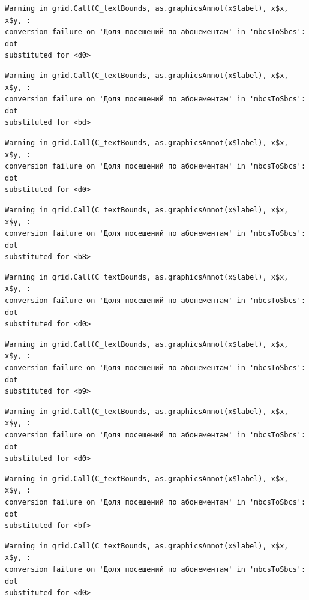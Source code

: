 \documentclass[
  letterpaper,
  DIV=11,
  numbers=noendperiod]{scrartcl}
\begin{document}
\begin{verbatim}
Warning in grid.Call(C_textBounds, as.graphicsAnnot(x$label), x$x, x$y, :
conversion failure on 'Доля посещений по абонементам' in 'mbcsToSbcs': dot
substituted for <d0>
\end{verbatim}

\begin{verbatim}
Warning in grid.Call(C_textBounds, as.graphicsAnnot(x$label), x$x, x$y, :
conversion failure on 'Доля посещений по абонементам' in 'mbcsToSbcs': dot
substituted for <bd>
\end{verbatim}

\begin{verbatim}
Warning in grid.Call(C_textBounds, as.graphicsAnnot(x$label), x$x, x$y, :
conversion failure on 'Доля посещений по абонементам' in 'mbcsToSbcs': dot
substituted for <d0>
\end{verbatim}

\begin{verbatim}
Warning in grid.Call(C_textBounds, as.graphicsAnnot(x$label), x$x, x$y, :
conversion failure on 'Доля посещений по абонементам' in 'mbcsToSbcs': dot
substituted for <b8>
\end{verbatim}

\begin{verbatim}
Warning in grid.Call(C_textBounds, as.graphicsAnnot(x$label), x$x, x$y, :
conversion failure on 'Доля посещений по абонементам' in 'mbcsToSbcs': dot
substituted for <d0>
\end{verbatim}

\begin{verbatim}
Warning in grid.Call(C_textBounds, as.graphicsAnnot(x$label), x$x, x$y, :
conversion failure on 'Доля посещений по абонементам' in 'mbcsToSbcs': dot
substituted for <b9>
\end{verbatim}

\begin{verbatim}
Warning in grid.Call(C_textBounds, as.graphicsAnnot(x$label), x$x, x$y, :
conversion failure on 'Доля посещений по абонементам' in 'mbcsToSbcs': dot
substituted for <d0>
\end{verbatim}

\begin{verbatim}
Warning in grid.Call(C_textBounds, as.graphicsAnnot(x$label), x$x, x$y, :
conversion failure on 'Доля посещений по абонементам' in 'mbcsToSbcs': dot
substituted for <bf>
\end{verbatim}

\begin{verbatim}
Warning in grid.Call(C_textBounds, as.graphicsAnnot(x$label), x$x, x$y, :
conversion failure on 'Доля посещений по абонементам' in 'mbcsToSbcs': dot
substituted for <d0>
\end{verbatim}
\end{document}
